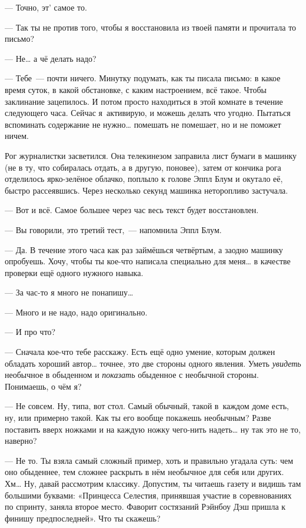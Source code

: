 \documentclass[fontsize=11pt,a5paper,titlepage=firstcover]{scrbook}
\begin{document}
--- Точно, эт’ самое то.

--- Так ты не против того, чтобы я восстановила из твоей памяти и прочитала то письмо?

--- Не{\ldots} а чё делать надо?

--- Тебе~--- почти ничего. Минутку подумать, как ты писала письмо: в какое время суток, в какой обстановке, с каким настроением, всё такое. Чтобы заклинание зацепилось. И потом просто находиться в этой комнате в течение следующего часа. Сейчас я~активирую, и можешь делать что угодно. Пытаться вспоминать содержание не нужно{\ldots} помешать не помешает, но и не поможет ничем.

Рог журналистки засветился. Она телекинезом заправила лист бумаги в машинку (не в ту, что собиралась отдать, а в другую, поновее), затем от кончика рога отделилось ярко-зелёное облачко, поплыло к голове Эппл Блум и окутало её, быстро рассеявшись. Через несколько секунд машинка неторопливо застучала.

--- Вот и всё. Самое большее через час весь текст будет восстановлен.

--- Вы говорили, это третий тест,~--- напомнила Эппл Блум.

--- Да. В течение этого часа как раз займёшься четвёртым, а заодно машинку опробуешь. Хочу, чтобы ты кое-что написала специально для меня{\ldots} в качестве проверки ещё одного нужного навыка.

--- За час-то я много не понапишу{\ldots}

--- Много и не надо, надо оригинально.

--- И про что?

--- Сначала кое-что тебе расскажу. Есть ещё одно умение, которым должен обладать хороший автор{\ldots} точнее, это две стороны одного явления. Уметь \emph{увидеть} необычное в обыденном и \emph{показать} обыденное с необычной стороны. Понимаешь, о чём я?

--- Не совсем. Ну, типа, вот стол. Самый обычный, такой в~каждом доме есть, ну, или примерно такой. Как ты его вообще покажешь необычным? Разве поставить вверх ножками и на каждую ножку чего-нить надеть{\ldots} ну так это не то, наверно?

--- Не то. Ты взяла самый сложный пример, хоть и правильно угадала суть: чем оно обыденнее, тем сложнее раскрыть в нём необычное для себя или других. Хм{\ldots} Ну, давай рассмотрим классику. Допустим, ты читаешь газету и видишь там большими буквами: «Принцесса Селестия, принявшая участие в соревнованиях по спринту, заняла второе место. Фаворит состязаний Рэйнбоу Дэш пришла к финишу предпоследней». Что ты скажешь?
\end{document}
